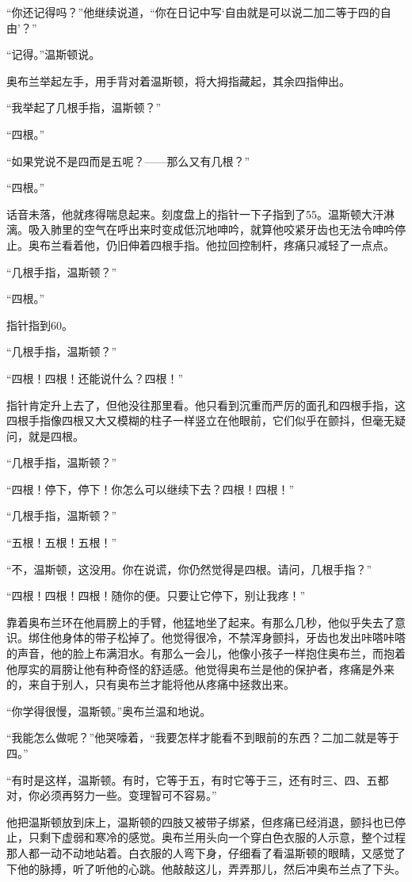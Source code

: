``你还记得吗？''他继续说道，``你在日记中写`自由就是可以说二加二等于四的自由'？''

``记得。''温斯顿说。

奥布兰举起左手，用手背对着温斯顿，将大拇指藏起，其余四指伸出。

``我举起了几根手指，温斯顿？''

``四根。''

``如果党说不是四而是五呢？——那么又有几根？''

``四根。''

话音未落，他就疼得喘息起来。刻度盘上的指针一下子指到了55。温斯顿大汗淋漓。吸入肺里的空气在呼出来时变成低沉地呻吟，就算他咬紧牙齿也无法令呻吟停止。奥布兰看着他，仍旧伸着四根手指。他拉回控制杆，疼痛只减轻了一点点。

``几根手指，温斯顿？''

``四根。''

指针指到60。

``几根手指，温斯顿？''

``四根！四根！还能说什么？四根！''

指针肯定升上去了，但他没往那里看。他只看到沉重而严厉的面孔和四根手指，这四根手指像四根又大又模糊的柱子一样竖立在他眼前，它们似乎在颤抖，但毫无疑问，就是四根。

``几根手指，温斯顿？''

``四根！停下，停下！你怎么可以继续下去？四根！四根！''

``几根手指，温斯顿？''

``五根！五根！五根！''

``不，温斯顿，这没用。你在说谎，你仍然觉得是四根。请问，几根手指？''

``四根！四根！四根！随你的便。只要让它停下，别让我疼！''

靠着奥布兰环在他肩膀上的手臂，他猛地坐了起来。有那么几秒，他似乎失去了意识。绑住他身体的带子松掉了。他觉得很冷，不禁浑身颤抖，牙齿也发出咔嗒咔嗒的声音，他的脸上布满泪水。有那么一会儿，他像小孩子一样抱住奥布兰，而抱着他厚实的肩膀让他有种奇怪的舒适感。他觉得奥布兰是他的保护者，疼痛是外来的，来自于别人，只有奥布兰才能将他从疼痛中拯救出来。

``你学得很慢，温斯顿。''奥布兰温和地说。

``我能怎么做呢？''他哭嚎着，``我要怎样才能看不到眼前的东西？二加二就是等于四。''

``有时是这样，温斯顿。有时，它等于五，有时它等于三，还有时三、四、五都对，你必须再努力一些。变理智可不容易。''

他把温斯顿放到床上，温斯顿的四肢又被带子绑紧，但疼痛已经消退，颤抖也已停止，只剩下虚弱和寒冷的感觉。奥布兰用头向一个穿白色衣服的人示意，整个过程那人都一动不动地站着。白衣服的人弯下身，仔细看了看温斯顿的眼睛，又感觉了下他的脉搏，听了听他的心跳。他敲敲这儿，弄弄那儿，然后冲奥布兰点了下头。

